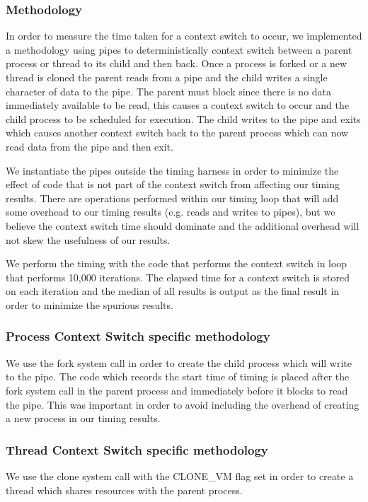 \subsubsection{Methodology}

In order to measure the time taken for a context switch to occur, we implemented
a methodology using pipes to deterministically context switch between a parent
process or thread to its child and then back. Once a process is forked or a new
thread is cloned the parent reads from a pipe and the child writes a single
character of data to the pipe. The parent must block since there is no data
immediately available to be read, this causes a context switch to occur and the
child process to be scheduled for execution. The child writes to the pipe and
exits which causes another context switch back to the parent process which can
now read data from the pipe and then exit. 

We instantiate the pipes outside the timing harness in order to minimize the effect
of code that is not part of the context switch from affecting our timing
results. There are operations performed within our timing loop that will add
some overhead to our timing results (e.g. reads and writes to pipes), but we
believe the context switch time should dominate and the additional overhead will
not skew the usefulness of our results.

We perform the timing with the code that performs the context switch in loop
that performs 10,000 iterations. The elapsed time for a context switch is stored
on each iteration and the median of all results is output as the final result in
order to minimize the spurious results.

\subsubsection{Process Context Switch specific methodology} 
We use the fork system call in order to create the child process which will
write to the pipe. The code which records the start time of timing is placed 
after the fork system call in the parent process and immediately before it blocks
 to read the pipe. This was important in order to avoid including the overhead of 
 creating a new process in our timing results.

\subsubsection{Thread Context Switch specific methodology}
We use the clone system call with the CLONE\_VM flag set in order to create a
thread which shares resources with the parent process. 

